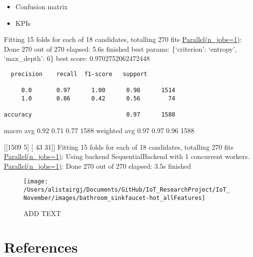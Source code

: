 \documentclass[11pt,]{article}
\providecommand{\tightlist}{%
  \setlength{\itemsep}{0pt}\setlength{\parskip}{0pt}}
\begin{document}
\begin{itemize}
\tightlist
\item
  Confusion matrix
\item
  KPIs
\end{itemize}

Fitting 15 folds for each of 18 candidates, totalling 270 fits
\href{Done\%20270\%20out\%20of\%20270\%20\%7C\%20elapsed:\%202.1s\%20finished}{Parallel(n\_jobs=1)}:
Done 270 out of 270 \textbar{} elapsed: 5.6s finished best params:
\{`criterion': `entropy', `max\_depth': 6\} best score:
0.9702752062472448

\begin{verbatim}
  precision    recall  f1-score   support

     0.0       0.97      1.00      0.98      1514
     1.0       0.86      0.42      0.56        74

accuracy                           0.97      1588
\end{verbatim}

macro avg 0.92 0.71 0.77 1588 weighted avg 0.97 0.97 0.96 1588

{[}{[}1509 5{]} {[} 43 31{]}{]} Fitting 15 folds for each of 18
candidates, totalling 270 fits
\href{Done\%20270\%20out\%20of\%20270\%20\%7C\%20elapsed:\%202.1s\%20finished}{Parallel(n\_jobs=1)}:
Using backend SequentialBackend with 1 concurrent workers.
\href{Done\%20270\%20out\%20of\%20270\%20\%7C\%20elapsed:\%202.1s\%20finished}{Parallel(n\_jobs=1)}:
Done 270 out of 270 \textbar{} elapsed: 3.5s finished

\begin{figure}[H]

{\centering \texttt{[image: /Users/alistairgj/Documents/GitHub/IoT\_ResearchProject/IoT\_November/images/bathroom\_sinkfaucet-hot\_allFeatures]} 

}

\caption{ADD TEXT}\label{fig:unnamed-chunk-21}
\end{figure}

\hypertarget{references}{%
\section{References}\label{references}}
\end{document}
